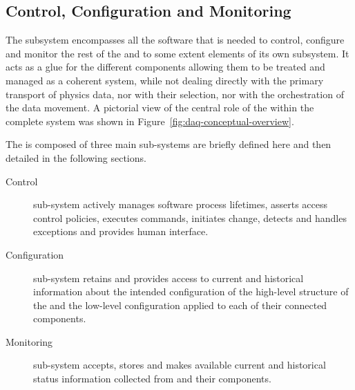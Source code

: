 \subsection{Control, Configuration and Monitoring}
\label{sec:fd-daq:design-run-control}


The  subsystem encompasses all the software that is needed to control, configure and monitor the rest of the  and to some extent elements of its own subsystem. 
It acts as a glue for the different  components allowing them to be treated and managed as a coherent system, while not dealing directly with the primary transport of physics data, nor with their selection, nor with the orchestration of the data movement. 
A pictorial view of the central role of the  within the complete  system was shown in Figure~\ref{fig:daq-conceptual-overview}.

The  is composed of three main sub-systems are briefly defined here and then detailed in the following sections.
\begin{description}

\item[Control] sub-system actively manages  software process lifetimes, asserts access control policies, executes commands, initiates change, detects and handles exceptions and provides human interface.


\item[Configuration] sub-system retains and provides access to current and historical information about the intended configuration of the high-level structure of the  and the low-level configuration applied to each of their connected components.

\item[Monitoring] sub-system accepts, stores and makes available current and historical status information collected from  and their components.

\end{description}

